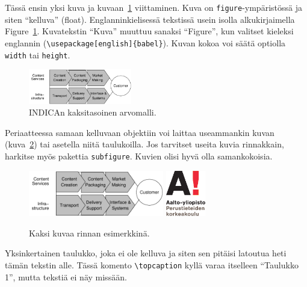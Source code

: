 Tässä ensin yksi kuva ja kuvaan~\ref{fig:indica_model} viittaminen.
Kuva on \verb!figure!-ympäristössä ja siten ``kelluva'' (float).
Englanninkielisessä tekstissä usein isolla alkukirjaimella
Figure~\ref{fig:indica_model}. Kuvatekstin ``Kuva'' muuttuu
sanaksi ``Figure'', kun valitset kieleksi englannin 
(\verb!\usepackage[english]{babel}!). Kuvan kokoa voi säätä
optiolla \verb!width! tai \verb!height!.

\begin{figure}[htb]
  \begin{center}
    \includegraphics[width=0.4\textwidth]{indica_model}
    \caption{INDICAn kaksitasoinen arvomalli.}
    \label{fig:indica_model}
  \end{center}
\end{figure}

Periaatteessa samaan kelluvaan objektiin voi laittaa useammankin kuvan
(kuva~\ref{fig:tuplat}) tai asetella niitä taulukoilla.
Jos tarvitset useita kuvia rinnakkain, harkitse
myös pakettia \verb!subfigure!. Kuvien olisi hyvä olla samankokoisia.

\begin{figure}[htb]
  \begin{center}
    \includegraphics[height=20mm]{indica_model}
    \hspace{10mm}  %
    \includegraphics[height=20mm]{AaltoSCI_FI_1}
    \caption{Kaksi kuvaa rinnan esimerkkinä.}
    \label{fig:tuplat}
  \end{center}
\end{figure}

Yksinkertainen taulukko, joka ei ole kelluva ja siten sen pitäisi
latoutua heti tämän tekstin alle. Tässä komento \verb!\topcaption!
kyllä varaa itselleen ``Taulukko 1'', mutta tekstiä ei näy missään.

